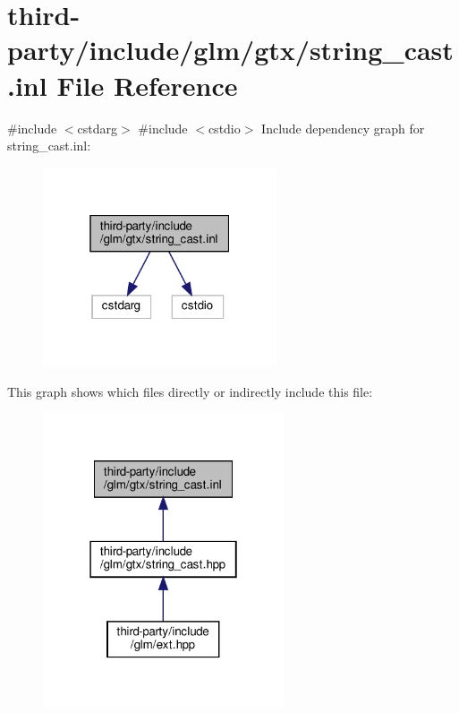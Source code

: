 \hypertarget{string__cast_8inl}{}\section{third-\/party/include/glm/gtx/string\+\_\+cast.inl File Reference}
\label{string__cast_8inl}
{\ttfamily \#include $<$cstdarg$>$}\newline
{\ttfamily \#include $<$cstdio$>$}\newline
Include dependency graph for string\+\_\+cast.\+inl\+:
\nopagebreak
\begin{figure}[H]
\begin{center}
\leavevmode
\includegraphics[width=196pt]{string__cast_8inl__incl}
\end{center}
\end{figure}
This graph shows which files directly or indirectly include this file\+:
\nopagebreak
\begin{figure}[H]
\begin{center}
\leavevmode
\includegraphics[width=202pt]{string__cast_8inl__dep__incl}
\end{center}
\end{figure}
